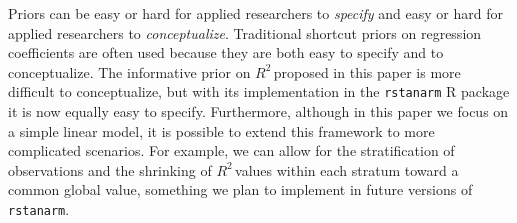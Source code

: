 \documentclass[11pt]{article}
\newcommand{\Rsq}{$R^2\,$}
\begin{document}
Priors can be easy or hard for applied researchers to \emph{specify} and easy or
hard for applied researchers to \emph{conceptualize}. Traditional shortcut
priors on regression coefficients are often used because they are both easy to
specify and to conceptualize. The informative prior on \Rsq proposed in this
paper is more difficult to conceptualize, but with its implementation in the
{\tt rstanarm} R package it is now equally easy to specify. Furthermore,
although in this paper we focus on a simple linear model, it is possible to
extend this framework to more complicated scenarios. For example, we can allow
for the stratification of observations and the shrinking of \Rsq values within
each stratum toward a common global value, something we plan to implement in
future versions of {\tt rstanarm}.


\nocite{Rcore}
\nocite{HSAUR3-package}



\end{document}

